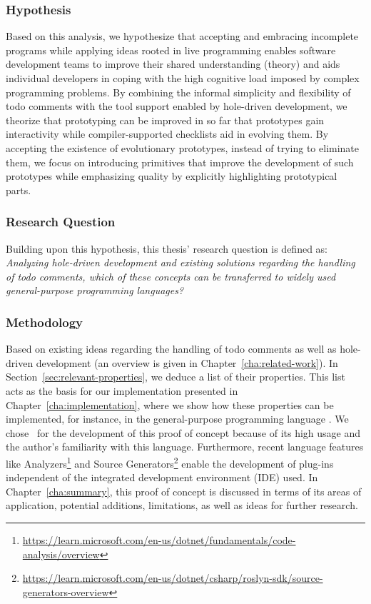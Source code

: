 \subsubsection{Hypothesis}
Based on this analysis, we hypothesize that accepting and embracing incomplete programs while applying ideas rooted in live programming enables software development teams to improve their shared understanding (theory) and aids individual developers in coping with the high cognitive load imposed by complex programming problems.
By combining the informal simplicity and flexibility of todo comments with the tool support enabled by hole-driven development, we theorize that prototyping can be improved in so far that prototypes gain interactivity while compiler-supported checklists aid in evolving them.
By accepting the existence of evolutionary prototypes, instead of trying to eliminate them, we focus on introducing primitives that improve the development of such prototypes while emphasizing quality by explicitly highlighting prototypical parts.

\subsubsection{Research Question}
Building upon this hypothesis, this thesis' research question is defined as: \emph{Analyzing hole-driven development and existing solutions regarding the handling of todo comments, which of these concepts can be transferred to widely used general-purpose programming languages?}

\subsubsection{Methodology}
Based on existing ideas regarding the handling of todo comments as well as hole-driven development (an overview is given in Chapter~\ref{cha:related-work}).
In Section~\ref{sec:relevant-properties}, we deduce a list of their properties.
This list acts as the basis for our implementation presented in Chapter~\ref{cha:implementation}, where we show how these properties can be implemented, for instance, in the general-purpose programming language \CS.
We chose \CS\ for the development of this proof of concept because of its high usage \cite{stack_overflow_stack_2023, tiobe_software_bv_tiobe_2023} and the author's familiarity with this language.
Furthermore, recent language features like Analyzers\footnote{\url{https://learn.microsoft.com/en-us/dotnet/fundamentals/code-analysis/overview}} and Source Generators\footnote{\url{https://learn.microsoft.com/en-us/dotnet/csharp/roslyn-sdk/source-generators-overview}} enable the development of plug-ins independent of the integrated development environment (IDE) used.
In Chapter~\ref{cha:summary}, this proof of concept is discussed in terms of its areas of application, potential additions, limitations, as well as ideas for further research.
